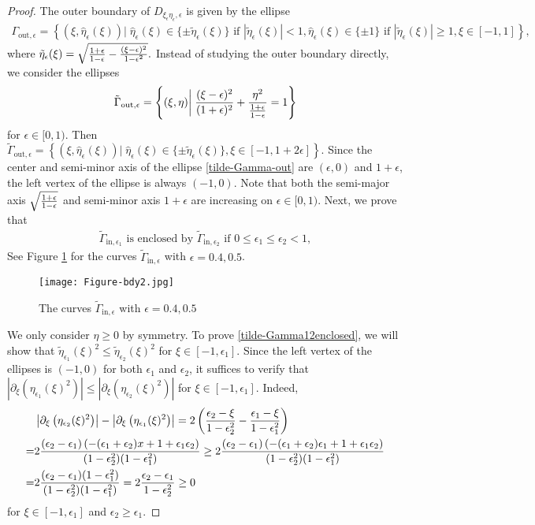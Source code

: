 \documentclass[1 [leqno, 11pt]{amsart}
\numberwithin{equation}{section}
\let\ep=\epsilon
\begin{document}
\begin{CJK*}{GBK}{song}
\begin{proof}
The outer boundary of $D_{\xi_{\ep}\eta_{\ep},\ep}$ is given by the ellipse
\begin{align*}
\Gamma_{\text{out},\ep}=\left\{(\xi,\hat\eta_\ep(\xi))\bigg|\;\hat\eta_\ep(\xi)\in\{\pm\tilde \eta_\ep(\xi)\} \text{ if } |\tilde \eta_\ep(\xi)|<1, \hat\eta_\ep(\xi)\in\{\pm1\} \text{ if } |\tilde \eta_\ep(\xi)|\geq1, \xi\in[-1,1]\right\},
\end{align*}
where
$
\tilde \eta_\ep(\xi)=\sqrt{{1+\ep\over 1-\ep}-{(\xi-\ep)^2\over 1-\ep^2}}.
$
Instead of studying the outer boundary directly, we consider the ellipses
\begin{align}\label{tilde-Gamma-out}
\tilde \Gamma_{\text{out},\ep}=\left\{(\xi,\eta)\bigg|\;\frac{(\xi - \ep)^2}{(1+\ep)^2} + {\eta^2\over {1+\ep\over 1-\ep}}=1\right\}
\end{align}
for $\ep\in[0,1)$.
Then $\tilde \Gamma_{\text{out},\ep}=\left\{(\xi,\hat\eta_\ep(\xi))\bigg|\;\hat\eta_\ep(\xi)\in\{\pm\tilde \eta_\ep(\xi)\}, \xi\in[-1,1+2\ep]\right\}$.
Since the center and semi-minor axis of the ellipse \eqref{tilde-Gamma-out} are $(\ep,0)$ and $1+\ep$, the left vertex of the ellipse is always $(-1,0)$.
Note that both the semi-major axis $\sqrt{1+\ep\over1-\ep}$  and semi-minor axis $1+\ep$ are increasing on $\ep\in[0,1)$. Next, we prove that
\begin{align}\label{tilde-Gamma12enclosed}
\tilde\Gamma_{\text{in},\ep_1}\text{  is  enclosed by }\tilde\Gamma_{\text{in},\ep_2} \text{ if }0\leq \ep_1\leq \ep_2<1,
\end{align}
 See Figure \ref{figbdy2} for the curves  $\tilde\Gamma_{\text{in},\ep}$ with $\ep=0.4, 0.5$.
\begin{figure}[ht]
    \centering
	\texttt{[image: Figure-bdy2.jpg]}
	\caption{The curves  $\tilde\Gamma_{\text{in},\ep}$ with $\ep=0.4, 0.5$}
	\label{figbdy2}
\end{figure}
We only  consider $\eta\geq0$ by symmetry.
To prove \eqref{tilde-Gamma12enclosed}, we will show that $\tilde\eta_{\ep_1}(\xi)^2\leq\tilde\eta_{\ep_2}(\xi)^2$ for $\xi\in[-1,\ep_1]$.
Since the left vertex of the ellipses is  $(-1,0)$ for both $\ep_1$ and $\ep_2$, it suffices to verify that $\left|\partial_{\xi}\left(\eta_{\ep_1}(\xi)^2\right)\right|\leq\left|\partial_{\xi}\left(\eta_{\ep_2}(\xi)^2\right)\right|$ for $\xi\in[-1,\ep_1]$. Indeed,
\begin{align*}
&\left|\partial_{\xi}\left(\eta_{\ep_2}(\xi)^2\right)\right|-\left|\partial_{\xi}\left(\eta_{\ep_1}(\xi)^2\right)\right|=2\left(\frac{ \ep_2-\xi }{1-\ep_2^2}-\frac{\ep_1-\xi}{1-\ep_1^2}\right)\\
=&2{(\ep_2-\ep_1)\left(-(\ep_1+\ep_2)x+1+\ep_1\ep_2\right)\over (1-\ep_2^2)(1-\ep_1^2)}\geq 2{(\ep_2-\ep_1)\left(-(\ep_1+\ep_2)\ep_1+1+\ep_1\ep_2\right)\over (1-\ep_2^2)(1-\ep_1^2)}\\
=&2{(\ep_2-\ep_1)(1-\ep_1^2)\over (1-\ep_2^2)(1-\ep_1^2)}=2{\ep_2-\ep_1\over 1-\ep_2^2}\geq0
\end{align*}
 for $\xi\in[-1,\ep_1]$ and $\ep_2\geq\ep_1$.
\fi


\end{proof}
\end{CJK*}
\end{document}
